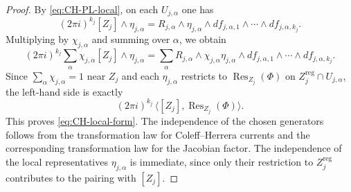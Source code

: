 \documentclass[10pt,a4paper]{amsart}
\newcommand{\reg}{\mathrm{reg}}
\begin{document}
\begin{proof}
By \eqref{eq:CH-PL-local}, on each $U_{j,\alpha}$ one has
$$
(2\pi i)^{k_j}[Z_j]\wedge \eta_{j,\alpha}
=
R_{j,\alpha}\wedge \eta_{j,\alpha}\wedge
df_{j,\alpha,1}\wedge\cdots\wedge df_{j,\alpha,k_j}.
$$
Multiplying by $\chi_{j,\alpha}$ and summing over $\alpha$, we obtain
$$
(2\pi i)^{k_j}\sum_\alpha \chi_{j,\alpha}[Z_j]\wedge \eta_{j,\alpha}
=
\sum_\alpha
R_{j,\alpha}\wedge \chi_{j,\alpha}\eta_{j,\alpha}\wedge
df_{j,\alpha,1}\wedge\cdots\wedge df_{j,\alpha,k_j}.
$$
Since $\sum_\alpha \chi_{j,\alpha}=1$ near $Z_j$ and each $\eta_{j,\alpha}$ restricts to $\operatorname{Res}_{Z_j}(\Phi)$ on $Z_j^{\reg}\cap U_{j,\alpha}$, the left-hand side is exactly
$$
(2\pi i)^{k_j}\,\langle [Z_j],\operatorname{Res}_{Z_j}(\Phi)\rangle.
$$
This proves \eqref{eq:CH-local-form}. The independence of the chosen generators follows from the transformation law for Coleff--Herrera currents and the corresponding transformation law for the Jacobian factor. The independence of the local representatives $\eta_{j,\alpha}$ is immediate, since only their restriction to $Z_j^{\reg}$ contributes to the pairing with $[Z_j]$.
\end{proof}
\end{document}
